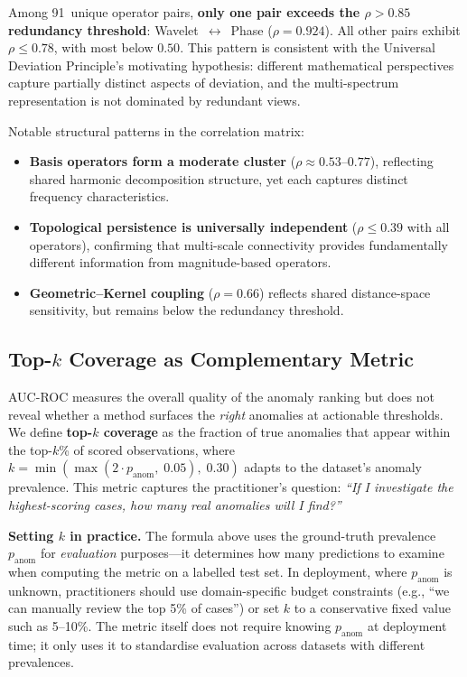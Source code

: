 \documentclass[journal]{IEEEtran}
\begin{document}
Among 91~unique operator pairs, \textbf{only one pair exceeds the $\rho > 0.85$ redundancy threshold}: Wavelet~$\leftrightarrow$~Phase ($\rho = 0.924$). All other pairs exhibit $\rho \leq 0.78$, with most below $0.50$. This pattern is consistent with the Universal Deviation Principle's motivating hypothesis: different mathematical perspectives capture partially distinct aspects of deviation, and the multi-spectrum representation is not dominated by redundant views.

Notable structural patterns in the correlation matrix:
\begin{itemize}
  \item \textbf{Basis operators form a moderate cluster} ($\rho \approx 0.53$--$0.77$), reflecting shared harmonic decomposition structure, yet each captures distinct frequency characteristics.
  \item \textbf{Topological persistence is universally independent} ($\rho \leq 0.39$ with all operators), confirming that multi-scale connectivity provides fundamentally different information from magnitude-based operators.
  \item \textbf{Geometric--Kernel coupling} ($\rho = 0.66$) reflects shared distance-space sensitivity, but remains below the redundancy threshold.
\end{itemize}

\subsection{Top-$k$ Coverage as Complementary Metric}
\label{sssec:coverage}

AUC-ROC measures the overall quality of the anomaly ranking but does not reveal whether a method surfaces the \emph{right} anomalies at actionable thresholds. We define \textbf{top-$k$ coverage} as the fraction of true anomalies that appear within the top-$k$\% of scored observations, where $k = \min(\max(2 \cdot p_{\text{anom}},\; 0.05),\; 0.30)$ adapts to the dataset's anomaly prevalence. This metric captures the practitioner's question: \textit{``If I investigate the highest-scoring cases, how many real anomalies will I find?''}

\textbf{Setting $k$ in practice.} The formula above uses the ground-truth prevalence $p_{\text{anom}}$ for \emph{evaluation} purposes---it determines how many predictions to examine when computing the metric on a labelled test set.  In deployment, where $p_{\text{anom}}$ is unknown, practitioners should use domain-specific budget constraints (e.g., ``we can manually review the top 5\% of cases'') or set $k$ to a conservative fixed value such as 5--10\%.  The metric itself does not require knowing $p_{\text{anom}}$ at deployment time; it only uses it to standardise evaluation across datasets with different prevalences.
\end{document}
